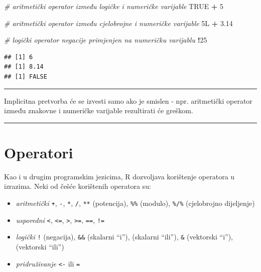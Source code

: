 \documentclass[]{book}
\newenvironment{Shaded}{\begin{snugshade}}{\end{snugshade}}
\newcommand{\DecValTok}[1]{\textcolor[rgb]{0.00,0.00,0.81}{#1}}
\newcommand{\FloatTok}[1]{\textcolor[rgb]{0.00,0.00,0.81}{#1}}
\newcommand{\StringTok}[1]{\textcolor[rgb]{0.31,0.60,0.02}{#1}}
\newcommand{\CommentTok}[1]{\textcolor[rgb]{0.56,0.35,0.01}{\textit{#1}}}
\newcommand{\OtherTok}[1]{\textcolor[rgb]{0.56,0.35,0.01}{#1}}
\newcommand{\OperatorTok}[1]{\textcolor[rgb]{0.81,0.36,0.00}{\textbf{#1}}}
\newcommand{\NormalTok}[1]{#1}
\providecommand{\tightlist}{%
  \setlength{\itemsep}{0pt}\setlength{\parskip}{0pt}}
\theoremstyle{definition}
\theoremstyle{definition}
\theoremstyle{definition}
\theoremstyle{remark}
\begin{document}
\begin{Shaded}
\begin{Highlighting}[]
\CommentTok{# aritmetički operator između logičke i numeričke varijable}
\OtherTok{TRUE} \OperatorTok{+}\StringTok{ }\DecValTok{5}

\CommentTok{# aritmetički operator između cjelobrojne i numeričke varijable}
\NormalTok{5L  }\OperatorTok{+}\StringTok{ }\FloatTok{3.14}

\CommentTok{# logički operator negacije primjenjen na numeričku varijablu}
\OperatorTok{!}\DecValTok{25}
\end{Highlighting}
\end{Shaded}

\begin{verbatim}
## [1] 6
## [1] 8.14
## [1] FALSE
\end{verbatim}

\begin{center}\rule{0.5\linewidth}{\linethickness}\end{center}

Implicitna pretvorba će se izvesti samo ako je smislen - npr.
aritmetički operator između znakovne i numeričke varijable rezultirati
će greškom.

\begin{center}\rule{0.5\linewidth}{\linethickness}\end{center}

\section{Operatori}\label{operatori}

Kao i u drugim programskim jezicima, R dozvoljava korištenje operatora u
izrazima. Neki od češće korištenih operatora su:

\begin{itemize}
\tightlist
\item
  \emph{aritmetički} \texttt{+}, \texttt{-}, \texttt{*}, \texttt{/},
  \texttt{**} (potencija), \texttt{\%\%} (modulo), \texttt{\%/\%}
  (cjelobrojno dijeljenje)
\item
  \emph{usporedni} \texttt{\textless{}}, \texttt{\textless{}=},
  \texttt{\textgreater{}}, \texttt{\textgreater{}=}, \texttt{==},
  \texttt{!=}
\item
  \emph{logički} \texttt{!} (negacija), \texttt{\&\&} (skalarni ``i''),
  \texttt{\textbar{}\textbar{}} (skalarni ``ili''), \texttt{\&}
  (vektorski ``i''), \texttt{\textbar{}} (vektorski ``ili'')
\item
  \emph{pridruživanje} \texttt{\textless{}-} ili \texttt{=}
\end{itemize}
\end{document}
